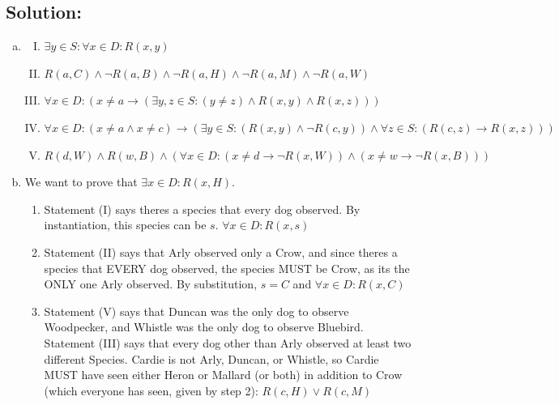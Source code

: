 \documentclass[12pt]{article}
\begin{document}
	\subsection*{\textbf{Solution:}}
	\begin{enumerate}[(a)]
		\item
			\begin{enumerate}[I.]
				\item $\exists y \in S: \forall x \in D: R(x,y)$

				\item $R(a,C) \land\lnot R(a,B) \land\lnot R(a,H) \land\lnot R(a,M) \land
					\lnot R(a,W)$

				\item $\forall x \in D: (x\not=a \rightarrow (\exists y,z \in S: (y\not=z
					) \land R(x,y) \land R(x,z)))$

				\item $\forall x \in D: (x\not=a \land x\not=c) \rightarrow (\exists y \in
					S: (R(x,y) \land \lnot R(c,y)) \land \forall z \in S: (R(c,z) \rightarrow
					R(x, z)))$

				\item $R(d,W) \land R(w,B) \land (\forall x \in D: (x\not=d \rightarrow \lnot
					R(x,W)) \land (x\not=w \rightarrow \lnot R(x,B)))$
			\end{enumerate}

		\item We want to prove that $\exists x \in D: R(x,H)$.

			\begin{enumerate}[1.]
				\item Statement (I) says theres a species that every dog observed. By
					instantiation, this species can be $s$. $\forall x \in D: R(x,s)$

				\item Statement (II) says that Arly observed only a Crow, and since
					theres a species that EVERY dog observed, the species MUST be Crow, as
					its the ONLY one Arly observed. By substitution, $s=C$ and
					$\forall x \in D: R(x,C)$

				\item Statement (V) says that Duncan was the only dog to observe Woodpecker,
					and Whistle was the only dog to observe Bluebird. Statement (III) says
					that every dog other than Arly observed at least two different Species.
					Cardie is not Arly, Duncan, or Whistle, so Cardie MUST have seen either
					Heron or Mallard (or both) in addition to Crow (which everyone has
					seen, given by step 2): $R(c,H) \lor R(c,M)$


\end{enumerate}
\end{enumerate}
\end{document}
